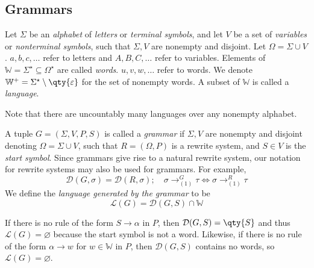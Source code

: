 \subsection{Grammars}
\begin{definition}
	Let \( \Sigma \) be an \emph{alphabet} of \emph{letters} or \emph{terminal symbols}, and let \( V \) be a set of \emph{variables} or \emph{nonterminal symbols}, such that \( \Sigma, V \) are nonempty and disjoint.
	Let \( \Omega = \Sigma \cup V \).
	\( a, b, c, \dots \) refer to letters and \( A, B, C, \dots \) refer to variables.
	Elements of \( \mathbb W = \Sigma^\star \subseteq \Omega^\star \) are called \emph{words}.
	\( u, v, w, \dots \) refer to words.
	We denote \( \mathbb W^+ = \Sigma^\star \setminus \qty{\varepsilon} \) for the set of nonempty words.
	A subset of \( \mathbb W \) is called a \emph{language}.
\end{definition}
Note that there are uncountably many languages over any nonempty alphabet.
\begin{definition}
	A tuple \( G = (\Sigma, V, P, S) \) is called a \emph{grammar} if \( \Sigma, V \) are nonempty and disjoint denoting \( \Omega = \Sigma \cup V \), such that \( R = (\Omega, P) \) is a rewrite system, and \( S \in V \) is the \emph{start symbol}.
	Since grammars give rise to a natural rewrite system, our notation for rewrite systems may also be used for grammars.
	For example,
	\[ \mathcal D(G, \sigma) = \mathcal D(R, \sigma);\quad \sigma \to^G_{(1)} \tau \iff \sigma \to^R_{(1)} \tau \]
	We define the \emph{language generated by the grammar} to be
	\[ \mathcal L(G) = \mathcal D(G,S) \cap \mathbb W \]
\end{definition}
\begin{example}
	If there is no rule of the form \( S \to \alpha \) in \( P \), then \( \mathcal D(G,S) = \qty{S} \) and thus \( \mathcal L(G) = \varnothing \) because the start symbol is not a word.
	Likewise, if there is no rule of the form \( \alpha \to w \) for \( w \in \mathbb W \) in \( P \), then \( \mathcal D(G,S) \) contains no words, so \( \mathcal L(G) = \varnothing \).
\end{example}
